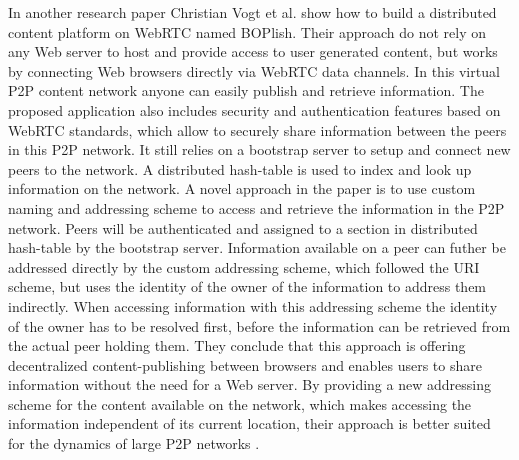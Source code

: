 In another research paper Christian Vogt et al. show how to build a distributed content platform on \gls{WebRTC} named BOPlish. Their approach do not rely on any Web server to host and provide access to user generated content, but works by connecting Web browsers directly via \gls{WebRTC} data channels. In this virtual \gls{P2P} content network anyone can easily publish and retrieve information. The proposed application also includes security and authentication features based on \gls{WebRTC} standards, which allow to securely share information between the peers in this \gls{P2P} network. It still relies on a bootstrap server to setup and connect new peers to the network. A distributed hash-table is used to index and look up information on the network. A novel approach in the paper is to use custom naming and addressing scheme to access and retrieve the information in the \gls{P2P} network. Peers will be authenticated and assigned to a section in distributed hash-table by the bootstrap server. Information available on a peer can futher be addressed directly by the custom addressing scheme, which followed the \gls{URI} scheme, but uses the identity of the owner of the information to address them indirectly. When accessing information with this addressing scheme the identity of the owner has to be resolved first, before the information can be retrieved from the actual peer holding them. They conclude that this approach is offering decentralized content-publishing between browsers and enables users to share information without the need for a Web server. By providing a new addressing scheme for the content available on the network, which makes accessing the information independent of its current location, their approach is better suited for the dynamics of large \gls{P2P} networks \citep{vogt2013content}.

